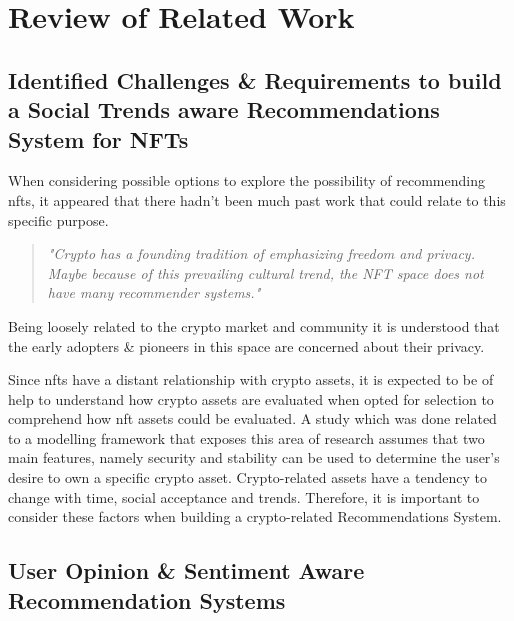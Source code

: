 \documentclass[manuscript,natbib=false, anonymous]{acmart}
\begin{document}
\section{Review of Related Work}

\subsection{Identified Challenges \& Requirements to build a Social Trends aware Recommendations System for NFTs}
When considering possible options to explore the possibility of recommending \gls{nft}s, it appeared that there hadn't been much past work that could relate to this specific purpose.

\begin{quote} 
\centering 
\emph{"Crypto has a founding tradition of emphasizing freedom and privacy. Maybe because of this prevailing cultural trend, the NFT space does not have many recommender systems."} 
\\
\raggedleft
\cite{WhatAreYou2020}
\end{quote}

Being loosely related to the crypto market and community \cite{dowlingNonfungibleTokenPricing2021} it is understood that the early adopters \& pioneers in this space are concerned about their privacy. 


Since \gls{nft}s have a distant relationship with crypto assets, it is expected to be of help to understand how crypto assets are evaluated when opted for selection to comprehend how \gls{nft} assets could be evaluated. A study which was done related to a modelling framework that exposes this area of research \cite{bartolucciModelOptimalSelection2020} assumes that two main features, namely security and stability can be used to determine the user's desire to own a specific crypto asset. Crypto-related assets have a tendency to change with time, social acceptance and trends. Therefore, it is important to consider these factors when building a crypto-related Recommendations System.
 
 
\subsection{User Opinion \& Sentiment Aware Recommendation Systems}
\end{document}
